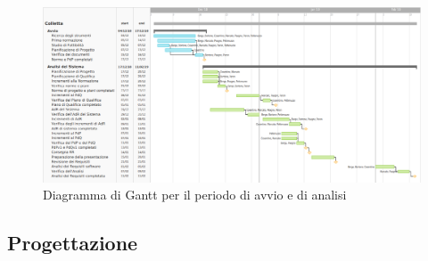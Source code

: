 	\newpage
	\begin{figure}[!hbtp]
		\centering
		\includegraphics[scale=0.5,angle=90]{images/ganttan.png}
		\caption{Diagramma di Gantt per il periodo di avvio e di analisi}
	\end{figure}
	
	\newpage
	\subsection{Progettazione}	
	
	\newpage
